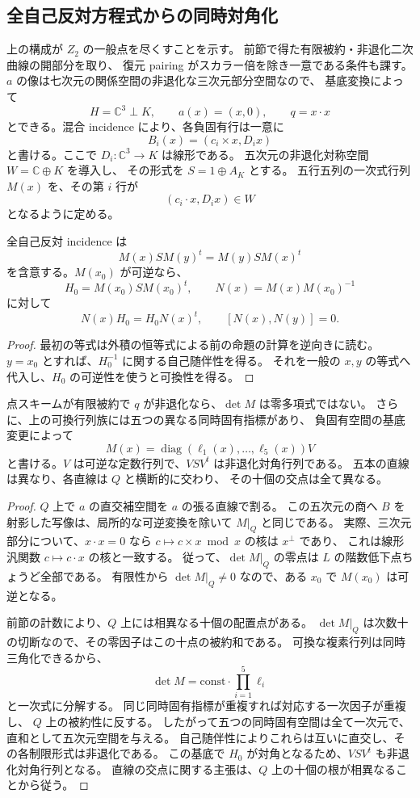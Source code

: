 \subsection{全自己反対方程式からの同時対角化}

上の構成が $Z_2$ の一般点を尽くすことを示す。
前節で得た有限被約・非退化二次曲線の開部分を取り、
復元 pairing がスカラー倍を除き一意である条件も課す。
$a$ の像は七次元の関係空間の非退化な三次元部分空間なので、
基底変換によって
\[
 H=\mathbb C^3\mathbin{\perp}K,\qquad a(x)=(x,0),\qquad q=x\cdot x
\]
とできる。混合 incidence により、各負固有行は一意に
\[
 B_i(x)=(c_i\times x,D_i x)
\]
と書ける。ここで $D_i:\mathbb C^3\to K$ は線形である。
五次元の非退化対称空間 $W=\mathbb C\oplus K$ を導入し、
その形式を $S=1\oplus A_K$ とする。
五行五列の一次式行列 $M(x)$ を、その第 $i$ 行が
\[
 (c_i\cdot x,D_i x)\in W
\]
となるように定める。

\begin{lemma}[可換な自己随伴行列]
\label{lem:master-commuting-v25}
全自己反対 incidence は
\[
 M(x)S M(y)^t=M(y)S M(x)^t
\]
を含意する。$M(x_0)$ が可逆なら、
\[
 H_0=M(x_0)S M(x_0)^t,\qquad
 N(x)=M(x)M(x_0)^{-1}
\]
に対して
\[
 N(x)H_0=H_0N(x)^t,\qquad [N(x),N(y)]=0.
\]
\end{lemma}
\begin{proof}
最初の等式は外積の恒等式による前の命題の計算を逆向きに読む。
$y=x_0$ とすれば、$H_0^{-1}$ に関する自己随伴性を得る。
それを一般の $x,y$ の等式へ代入し、$H_0$ の可逆性を使うと可換性を得る。
\end{proof}

\begin{lemma}[五つの異なる固有方向]
\label{lem:master-simple-spectrum-v25}
点スキームが有限被約で $q$ が非退化なら、$\det M$ は零多項式ではない。
さらに、上の可換行列族には五つの異なる同時固有指標があり、
負固有空間の基底変更によって
\[
 M(x)=\operatorname{diag}(\ell_1(x),\ldots,\ell_5(x))V
\]
と書ける。$V$ は可逆な定数行列で、$VSV^t$ は非退化対角行列である。
五本の直線は異なり、各直線は $Q$ と横断的に交わり、
その十個の交点は全て異なる。
\end{lemma}
\begin{proof}
$Q$ 上で $a$ の直交補空間を $a$ の張る直線で割る。
この五次元の商へ $B$ を射影した写像は、局所的な可逆変換を除いて $M|_Q$ と同じである。
実際、三次元部分について、$x\cdot x=0$ なら
$c\mapsto c\times x\bmod x$ の核は $x^\perp$ であり、
これは線形汎関数 $c\mapsto c\cdot x$ の核と一致する。
従って、$\det M|_Q$ の零点は $L$ の階数低下点ちょうど全部である。
有限性から $\det M|_Q\ne0$ なので、ある $x_0$ で $M(x_0)$ は可逆となる。

前節の計数により、$Q$ 上には相異なる十個の配置点がある。
$\det M|_Q$ は次数十の切断なので、その零因子はこの十点の被約和である。
可換な複素行列は同時三角化できるから、
\[
 \det M=\mathrm{const}\cdot\prod_{i=1}^5\ell_i
\]
と一次式に分解する。
同じ同時固有指標が重複すれば対応する一次因子が重複し、
$Q$ 上の被約性に反する。
したがって五つの同時固有空間は全て一次元で、直和として五次元空間を与える。
自己随伴性によりこれらは互いに直交し、その各制限形式は非退化である。
この基底で $H_0$ が対角となるため、$VSV^t$ も非退化対角行列となる。
直線の交点に関する主張は、$Q$ 上の十個の根が相異なることから従う。
\end{proof}

